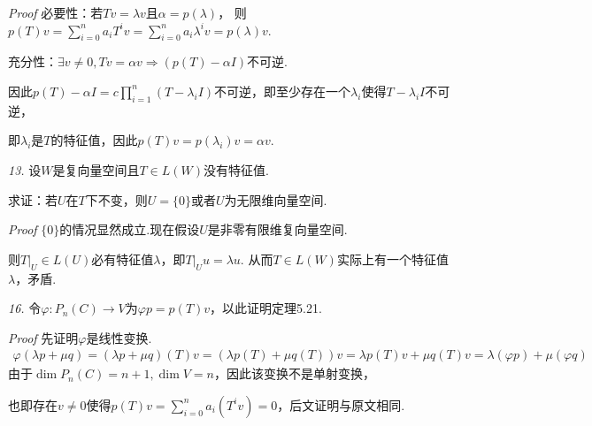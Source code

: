 \textit{Proof}
必要性：若\(Tv=\lambda v\)且\(\alpha=p(\lambda)\)，
则\(p(T)v=\sum_{i=0}^n a_iT^iv=\sum_{i=0}^n a_i\lambda^iv=p(\lambda)v\).

充分性：\(\exists v \ne 0,Tv=\alpha v \Rightarrow (p(T)-\alpha I)\)不可逆.

因此\(p(T)-\alpha I=c\prod_{i=1}^n (T-\lambda_i I)\)不可逆，即至少存在一个\(\lambda_i\)使得\(T-\lambda_i I\)不可逆，

即\(\lambda_i\)是\(T\)的特征值，因此\(p(T)v=p(\lambda_i)v=\alpha v\).

\hspace*{\fill}

\textit{13.}
设\(W\)是复向量空间且\(T \in L(W)\)没有特征值.

求证：若\(U\)在\(T\)下不变，则\(U=\{0\}\)或者\(U\)为无限维向量空间.

\textit{Proof}
\(\{0\}\)的情况显然成立.现在假设\(U\)是非零有限维复向量空间.

则\(T|_U \in L(U)\)必有特征值\(\lambda\)，即\(T|_U u=\lambda u\).
从而\(T \in L(W)\)实际上有一个特征值\(\lambda\)，矛盾.

\hspace*{\fill}

\textit{16.}
令\(\varphi:P_n(C) \rightarrow V\)为\(\varphi p=p(T)v\)，以此证明定理5.21.

\textit{Proof}
先证明\(\varphi\)是线性变换.
    \begin{align*}
        \varphi(\lambda p+\mu q)=(\lambda p+\mu q)(T)v=(\lambda p(T)+\mu q(T))v
        =\lambda p(T)v+\mu q(T)v=\lambda(\varphi p)+\mu(\varphi q)
    \end{align*}
由于\(\dim P_n(C)=n+1,\dim V=n\)，因此该变换不是单射变换，

也即存在\(v \ne 0\)使得\(p(T)v=\sum_{i=0}^n a_i(T^iv)=0\)，后文证明与原文相同.

